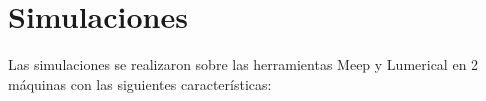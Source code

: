 \section{Simulaciones}
\label{sc:rr_simulation}

Las simulaciones se realizaron sobre las herramientas Meep y Lumerical en 2 máquinas con
las siguientes características:





